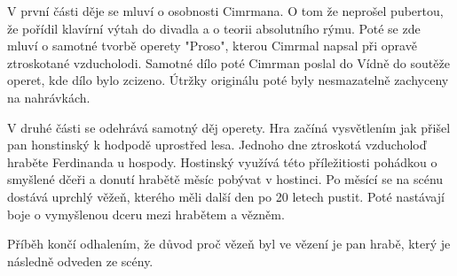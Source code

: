 V první části děje se mluví o osobnosti Cimrmana.
O tom že neprošel pubertou, že pořídil klavírní výtah do divadla a o teorii absolutního rýmu.
Poté se zde mluví o samotné tvorbě operety "Proso", kterou Cimrmal napsal při opravě ztroskotané vzducholodi.
Samotné dílo poté Cimrman poslal do Vídně do soutěže operet, kde dílo bylo zcizeno.
Útržky originálu poté byly nesmazatelně zachyceny na nahrávkách.

V druhé části se odehrává samotný děj operety.
Hra začíná vysvětlením jak přišel pan honstinský k hodpodě uprostřed lesa.
Jednoho dne ztroskotá vzducholoď hraběte Ferdinanda u hospody.
Hostinský využívá této příležitiosti pohádkou o smyšlené dčeři a donutí hrabětě měsíc pobývat v hostinci.
Po měsící se na scénu dostává uprchlý věžeň, kterého měli další den po 20 letech pustit.
Poté nastávají boje o vymyšlenou dceru mezi hrabětem a vězněm.

Příběh končí odhalením, že důvod proč vězeň byl ve vězení je pan hrabě, který je následně odveden ze scény.
